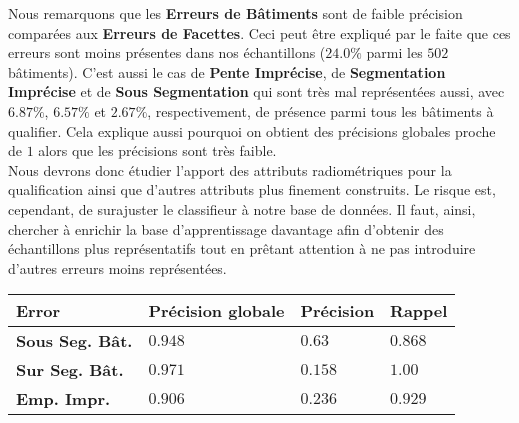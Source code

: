 \documentclass[a4paper,french]{article}
\begin{document}
    {\tiny
        \begin{table}[H]
            \begin{minipage}{.48\linewidth}
                Nous remarquons que les \textbf{Erreurs de Bâtiments} sont de faible précision comparées aux \textbf{Erreurs de Facettes}. Ceci peut être expliqué par le faite que ces erreurs sont moins présentes dans nos échantillons ($24.0\%$ parmi les $502$ bâtiments). C'est aussi le cas de \textbf{Pente Imprécise}, de \textbf{Segmentation Imprécise} et de \textbf{Sous Segmentation} qui sont très mal représentées aussi, avec $6.87\%$, $6.57\%$ et $2.67\%$, respectivement, de présence parmi tous les bâtiments à qualifier. Cela explique aussi pourquoi on obtient des précisions globales proche de $1$ alors que les précisions sont très faible.\\
                Nous devrons donc étudier l'apport des attributs radiométriques pour la qualification ainsi que d'autres attributs plus finement construits. Le risque est, cependant, de surajuster le classifieur à notre base de données. Il faut, ainsi, chercher à enrichir la base d'apprentissage davantage afin d'obtenir des échantillons plus représentatifs tout en prêtant attention à ne pas introduire d'autres erreurs moins représentées.
            \end{minipage}
            \begin{minipage}{.46\linewidth}
                \begin{minipage}{.05\linewidth}
                    \phantom{Stay Away}
                \end{minipage}
                \begin{minipage}{.95\linewidth}
                    \begin{flushright}
                        \begin{tabular}{x{2.5cm} x{1cm} x{1cm} x{1cm}}
                            \toprule
                            {\bf Error} & {\bf Précision globale} & {\bf Précision} & {\bf Rappel} \\
                            \midrule
                            \textbf{Sous Seg. Bât.} & $0.948$ & $0.63$ & $0.868$ \\
                            \midrule
                            \textbf{Sur Seg. Bât.} & $0.971$ & $0.158$ & $1.00$ \\
                            \midrule
                            \textbf{Emp. Impr.} & $0.906$ & $0.236$ & $0.929$ \\
                            \midrule

\end{tabular}
\end{flushright}
\end{minipage}
\end{minipage}
\end{table}}
\end{document}
